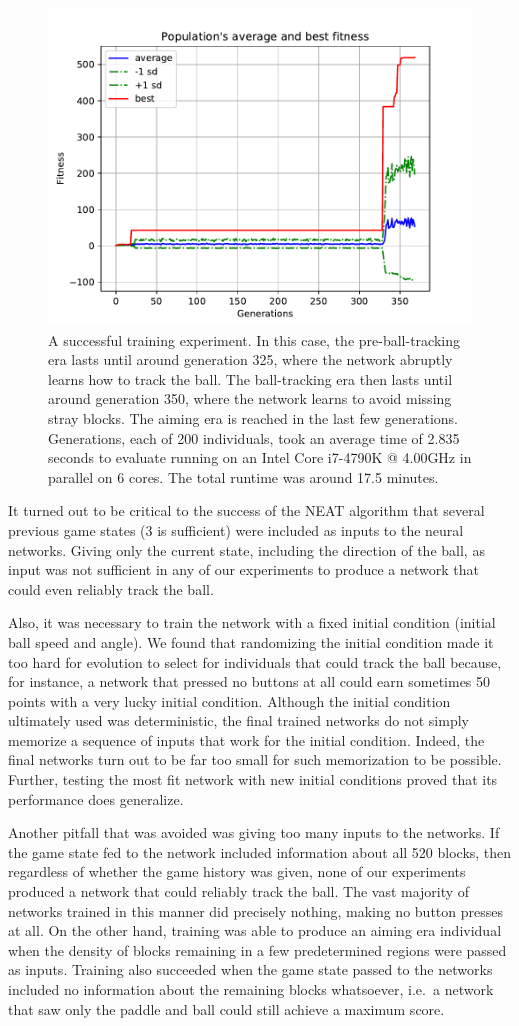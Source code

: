 \documentclass[letterpaper, twocolumn]{article}
\begin{document}
\begin{figure}[h!]
    \centering
    \includegraphics[width=.54 \textwidth]{avg_fitness.pdf}
    \caption{A successful training experiment. In this case, the pre-ball-tracking era lasts
        until around generation 325, where the network abruptly learns how to track the ball.
        The ball-tracking era then lasts until around generation 350, where the
	network learns to avoid missing stray blocks. 
	The aiming era is reached in the last few generations.
        Generations, each of 200 individuals, took an average time of 2.835 seconds to evaluate running on an
        Intel Core i7-4790K @ 4.00GHz in parallel on 6 cores. The total runtime was around 17.5 minutes.}
\end{figure}

It turned out to be critical to the success of the NEAT algorithm that several previous game states (3 is sufficient) were included as inputs to the neural networks.
Giving only the current state, including the direction of the ball, as input was not sufficient in any
of our experiments to produce a network that could even reliably track the ball.

Also, it was necessary to train the network with a fixed initial condition (initial ball speed and angle).
We found that randomizing the initial condition made it too hard for evolution to select for individuals
that could track the ball because, for instance,
a network that pressed no buttons at all could earn sometimes 50 points with a very lucky initial condition.
Although the initial condition ultimately used was deterministic,
the final trained networks do not simply memorize a sequence of inputs that work for the initial condition.
Indeed, the final networks turn out to be far too small for such memorization to be possible.
Further, testing the most fit network with new initial conditions proved that its performance does generalize.

Another pitfall that was avoided was giving too many inputs to the networks.
If the game state fed to the network
included information about all 520 blocks, then regardless of whether the game history was given,
none of our experiments produced a network that could reliably track the ball.
The vast majority of networks trained in this manner did precisely nothing, making no button presses
at all.
On the other hand, training was able to produce an aiming era individual
when the density of blocks remaining in a few predetermined regions were passed as inputs.
Training also succeeded when the game state passed to the networks included no information about the remaining blocks whatsoever, i.e.\ a network that saw only the paddle and ball could still achieve a maximum score.
\end{document}
